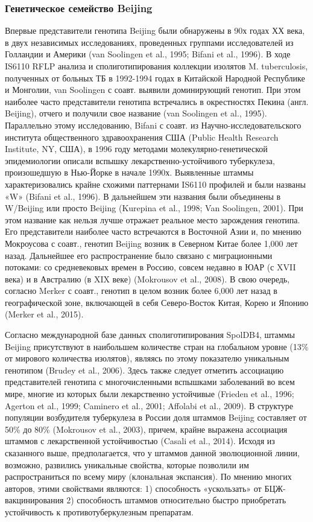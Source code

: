 \subsubsection{Генетическое семейство Beijing}
Впервые представители генотипа Beijing были обнаружены в 90х годах ХХ века, в двух независимых исследованиях, проведенных группами исследователей из Голландии и Америки (van Soolingen et al., 1995; Bifani et al., 1996). В ходе IS6110 RFLP анализа и сполиготипирования коллекции изолятов M. tuberculosis, полученных от больных ТБ в 1992-1994 годах в Китайской Народной Республике и Монголии, van Soolingen с соавт. выявили доминирующий генотип. При этом наиболее часто представители генотипа встречались в окрестностях Пекина (англ. Beijing), отчего и получили свое название (van Soolingen et al., 1995). Параллельно этому исследованию, Bifani с соавт. из Научно-исследовательского института общественного здравоохранения США (Public Health Research Institute, NY, США), в 1996 году методами молекулярно-генетической эпидемиологии описали вспышку лекарственно-устойчивого туберкулеза, произошедшую в Нью-Йорке в начале 1990х. Выявленные штаммы характеризовались крайне схожими паттернами IS6110 профилей и были названы «W» (Bifani et al., 1996). В дальнейшем эти названия были объединены в W/Beijing или просто Beijing (Kurepina et al., 1998; Van Soolingen, 2001). При этом название как нельзя лучше отражает реальное место зарождения генотипа. Его представители наиболее часто встречаются в Восточной Азии и, по мнению Мокроусова с соавт., генотип Beijing возник в Северном Китае более 1,000 лет назад. Дальнейшее его распространение было связано с миграционными потоками: со средневековых времен в Россию, совсем недавно в ЮАР (с XVII века) и в Австралию (в XIX веке) (Mokrousov et al., 2008). В свою очередь, согласно Merker с соавт., генотип в целом возник более 6,000 лет назад в географической зоне, включающей в себя Северо-Восток Китая, Корею и Японию (Merker et al., 2015).

Согласно международной базе данных сполиготипирования SpolDB4, штаммы Beijing присутствуют в наибольшем количестве стран на глобальном уровне (13\% от мирового количества изолятов), являясь по этому показателю уникальным генотипом (Brudey et al., 2006). Здесь также следует отметить ассоциацию представителей генотипа с многочисленными вспышками заболеваний во всем мире, многие из которых были лекарственно устойчивые (Frieden et al., 1996; Agerton et al., 1999; Caminero et al., 2001; Affolabi et al., 2009). В структуре популяции возбудителя туберкулеза в России доля штаммов Beijing составляет от 50\% до 80\% (Mokrousov et al., 2003), причем, крайне выражена ассоциация штаммов с лекарственной устойчивостью (Casali et al., 2014). Исходя из сказанного выше, предполагается, что у штаммов данной эволюционной линии, возможно, развились уникальные свойства, которые позволили им распространиться по всему миру (клональная экспансия). По мнению многих авторов, этими свойствами являются: 1) способность «ускользать» от БЦЖ-вакцинирования 2) способность штаммов относительно быстро приобретать устойчивость к противотуберкулезным препаратам.

